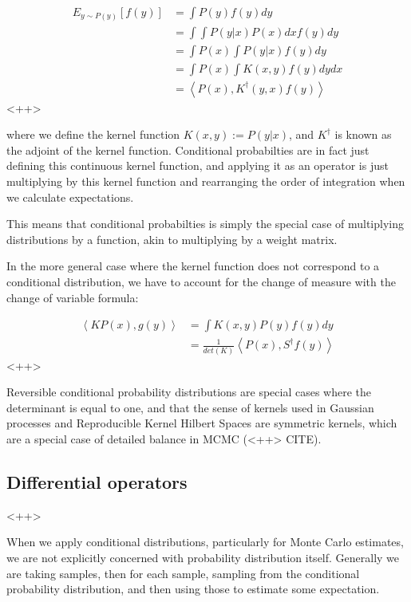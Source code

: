 \documentclass[a4paper]{article}
\begin{document}
\begin{equation}
  \begin{split}
    E_{ y \sim P(y)} \left[ f(y) \right] &= \int P(y) f(y) dy \\
    &= \int \int P(y \vert x) P(x) dx f(y) dy \\
    &= \int P(x) \int P(y \vert x) f(y) dy \\
    &= \int P(x) \int K(x,y) f(y) dy dx \\
    &= \left< P(x), K^{\dagger}(y,x) f(y) \right>
  \end{split}
  \label{<++>}
\end{equation}<++>

where we define the kernel function $K(x,y) := P(y \vert x)$, and $K^{\dagger}$ is known as the adjoint of the kernel function. 
Conditional probabilties are in fact just defining this continuous kernel function, and applying it as an operator is just multiplying by this kernel function and rearranging the order of integration when we calculate expectations. 

This means that conditional probabilties is simply the special case of multiplying distributions by a function, akin to multiplying by a weight matrix.

In the more general case where the kernel function does not correspond to a conditional distribution, we have to account for the change of measure with the change of variable formula:

\begin{equation}
  \begin{split}
    \left< K P(x), g(y) \right> &= \int K(x,y) P(y) f(y) dy \\
    &= \frac{1}{det(K)} \left< P(x), S^{\dagger} f(y) \right>
  \end{split}
  \label{<++>}
\end{equation}<++>

Reversible conditional probability distributions are special cases where the determinant is equal to one, and that the sense of kernels used in Gaussian processes and Reproducible Kernel Hilbert Spaces are symmetric kernels, which are a special case of detailed balance in MCMC (<++> CITE).

\subsection{Differential operators}<++>

When we apply conditional distributions, particularly for Monte Carlo estimates, we are not explicitly concerned with probability distribution itself. 
Generally we are taking samples, then for each sample, sampling from the conditional probability distribution, and then using those to estimate some expectation. 
\end{document}
